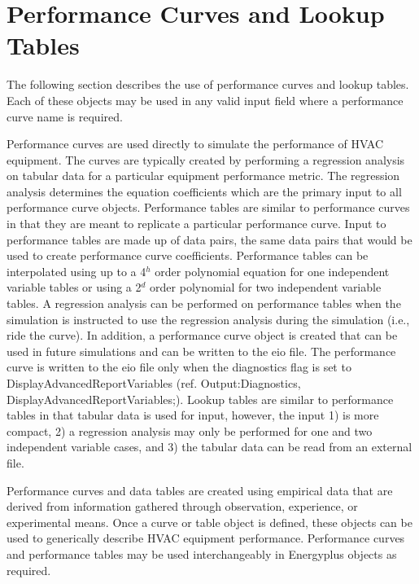 \chapter{Performance Curves and Lookup Tables}\label{performance-curves-and-lookup-tables}

The following section describes the use of performance curves and lookup tables. Each of these objects may be used in any valid input field where a performance curve name is required.

Performance curves are used directly to simulate the performance of HVAC equipment. The curves are typically created by performing a regression analysis on tabular data for a particular equipment performance metric. The regression analysis determines the equation coefficients which are the primary input to all performance curve objects. Performance tables are similar to performance curves in that they are meant to replicate a particular performance curve. Input to performance tables are made up of data pairs, the same data pairs that would be used to create performance curve coefficients. Performance tables can be interpolated using up to a 4\(^{h}\) order polynomial equation for one independent variable tables or using a 2\(^{d}\) order polynomial for two independent variable tables. A regression analysis can be performed on performance tables when the simulation is instructed to use the regression analysis during the simulation (i.e., ride the curve). In addition, a performance curve object is created that can be used in future simulations and can be written to the eio file. The performance curve is written to the eio file only when the diagnostics flag is set to DisplayAdvancedReportVariables (ref. Output:Diagnostics, DisplayAdvancedReportVariables;). Lookup tables are similar to performance tables in that tabular data is used for input, however, the input 1) is more compact, 2) a regression analysis may only be performed for one and two independent variable cases, and 3) the tabular data can be read from an external file.

Performance curves and data tables are created using empirical data that are derived from information gathered through observation, experience, or experimental means. Once a curve or table object is defined, these objects can be used to generically describe HVAC equipment performance. Performance curves and performance tables may be used interchangeably in Energyplus objects as required.
